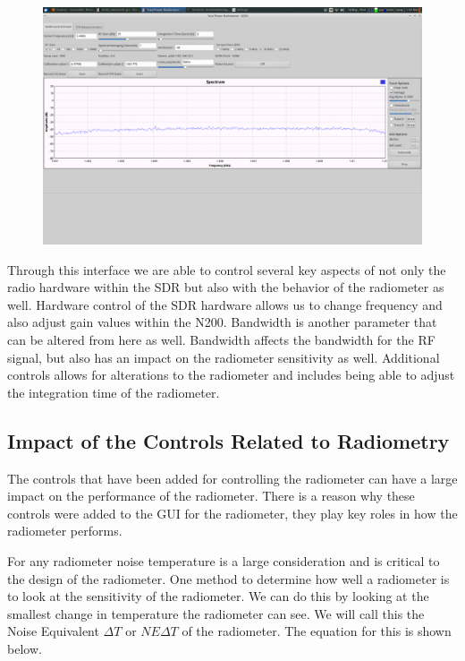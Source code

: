 {\begin{figure}[h!tb] 
\centering
\includegraphics[width=17cm]{Images/radiometer_gui.png}
\label{radiometer_gui}
\end{figure}
}

Through this interface we are able to control several key aspects of not only the radio hardware within the SDR but also with the behavior of the radiometer as well.  Hardware control of the SDR hardware allows us to change frequency and also adjust gain values within the N200.  Bandwidth is another parameter that can be altered from here as well.  Bandwidth affects the bandwidth for the RF signal, but also has an impact on the radiometer sensitivity as well.  Additional controls allows for alterations to the radiometer and includes being able to adjust the integration time of the radiometer.  

\subsection{Impact of the Controls Related to Radiometry}

The controls that have been added for controlling the radiometer can have a large impact on the performance of the radiometer.  There is a reason why these controls were added to the GUI for the radiometer, they play key roles in how the radiometer performs.  

For any radiometer noise temperature is a large consideration and is critical to the design of the radiometer.  One method to determine how well a radiometer is to look at the sensitivity of the radiometer.  We can do this by looking at the smallest change in temperature the radiometer can see.  We will call this the Noise Equivalent $\Delta T$ or $NE\Delta T$ of the radiometer.  The equation for this is shown below.

